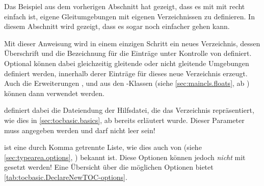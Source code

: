 Das Beispiel aus dem vorherigen Abschnitt hat gezeigt, dass es mit mit
 recht einfach ist, eigene Gleitumgebungen mit eigenen
Verzeichnissen zu definieren. In diesem Abschnitt wird gezeigt, dass es sogar
noch einfacher gehen kann.

\begin{Declaration}
\end{Declaration}%
Mit dieser Anweisung wird in einem
einzigen Schritt ein neues Verzeichnis, dessen Überschrift und die Bezeichnung
für die Einträge unter Kontrolle von  definiert. Optional
können dabei gleichzeitig gleitende oder nicht gleitende Umgebungen definiert
werden, innerhalb derer %
 Einträge für
dieses neue Verzeichnis erzeugt. Auch die Erweiterungen
,  und
 aus den \KOMAScript-Klassen (siehe
\autoref{sec:maincls.floats}, ab )
können dann verwendet werden.

 definiert dabei die Dateiendung der Hilfsdatei, die
das Verzeichnis repräsentiert, wie dies in \autoref{sec:tocbasic.basics}, ab
 bereits erläutert
wurde. Dieser Parameter muss angegeben werden und darf
nicht leer sein!

 ist eine durch Komma getrennte Liste, wie dies auch von
 (siehe \autoref{sec:typearea.options},
) bekannt ist. Diese
Optionen können jedoch \emph{nicht} mit
 gesetzt werden! Eine
Übersicht über die möglichen Optionen bietet
\autoref{tab:tocbasic.DeclareNewTOC-options}\iffalse ab
\autopageref{tab:tocbasic.DeclareNewTOC-options}\fi.

